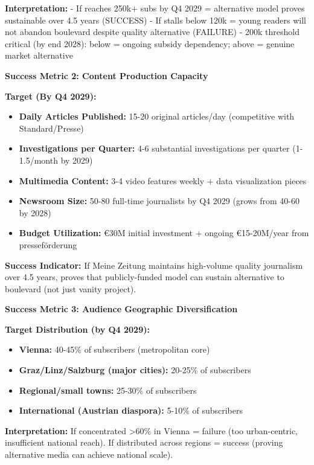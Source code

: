 \textbf{Interpretation:}
- If reaches 250k+ subs by Q4 2029 = alternative model proves sustainable over 4.5 years (SUCCESS)
- If stalls below 120k = young readers will not abandon boulevard despite quality alternative (FAILURE)
- 200k threshold critical (by end 2028): below = ongoing subsidy dependency; above = genuine market alternative

\textbf{Success Metric 2: Content Production Capacity}

\textbf{Target (By Q4 2029):}

\begin{itemize}
\item \textbf{Daily Articles Published:} 15-20 original articles/day (competitive with Standard/Presse)
\item \textbf{Investigations per Quarter:} 4-6 substantial investigations per quarter (1-1.5/month by 2029)
\item \textbf{Multimedia Content:} 3-4 video features weekly + data visualization pieces
\item \textbf{Newsroom Size:} 50-80 full-time journalists by Q4 2029 (grows from 40-60 by 2028)
\item \textbf{Budget Utilization:} €30M initial investment + ongoing €15-20M/year from presseförderung
\end{itemize}

\textbf{Success Indicator:} If Meine Zeitung maintains high-volume quality journalism over 4.5 years, proves that
publicly-funded model can sustain alternative to boulevard (not just vanity project).

\textbf{Success Metric 3: Audience Geographic Diversification}

\textbf{Target Distribution (by Q4 2029):}

\begin{itemize}
\item \textbf{Vienna:} 40-45\% of subscribers (metropolitan core)
\item \textbf{Graz/Linz/Salzburg (major cities):} 20-25\% of subscribers
\item \textbf{Regional/small towns:} 25-30\% of subscribers
\item \textbf{International (Austrian diaspora):} 5-10\% of subscribers
\end{itemize}

\textbf{Interpretation:} If concentrated >60\% in Vienna = failure (too urban-centric, insufficient national reach).
If distributed across regions = success (proving alternative media can achieve national scale).

